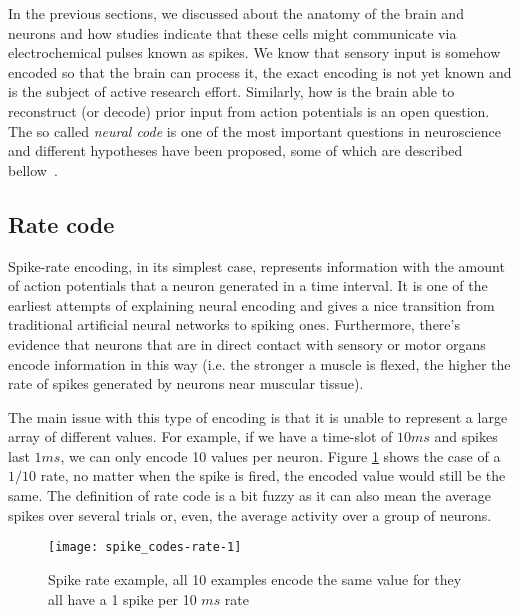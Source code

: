 In the previous sections, we discussed about the anatomy of the brain and neurons and how studies indicate that these cells might communicate via electrochemical pulses known as spikes. We know that sensory input is somehow encoded so that the brain can process it, the exact encoding is not yet known and is the subject of active research effort. Similarly, how is the brain able to reconstruct (or decode) prior input from action potentials is an open question. The so called \emph{neural code} is one of the most important questions in neuroscience and different hypotheses have been proposed, some of which are described bellow~\cite{dayan2001theoretical,gollisch2009throwing}.

\subsection{Rate code}
Spike-rate encoding, in its simplest case, represents information with the amount of action potentials that a neuron generated in a time interval. It is one of the earliest attempts of explaining neural encoding and gives a nice transition from traditional artificial neural networks to spiking ones. Furthermore, there's evidence that neurons that are in direct contact with sensory or motor organs encode information in this way (i.e. the stronger a muscle is flexed, the higher the rate of spikes generated by neurons near muscular tissue).

The main issue with this type of encoding is that it is unable to represent  a large array of different values. For example, if we have a time-slot of $10 ms$ and spikes last $1 ms$, we can only encode 10 values per neuron. Figure \ref{fig:neuro:spike-rate-encoding-cap} shows the case of a $1/10$ rate, no matter when the spike is fired, the encoded value would still be the same. The definition of rate code is a bit fuzzy as it can also mean the average spikes over several trials or, even, the average activity over a group of neurons.

\begin{figure}[hbt]
  \begin{center}
    \texttt{[image: spike\_codes-rate-1]}
    \caption{Spike rate example, all 10 examples encode the same value for they all have a 1 spike per 10 $ms$ rate}
    \label{fig:neuro:spike-rate-encoding-cap}
  \end{center}
\end{figure}


